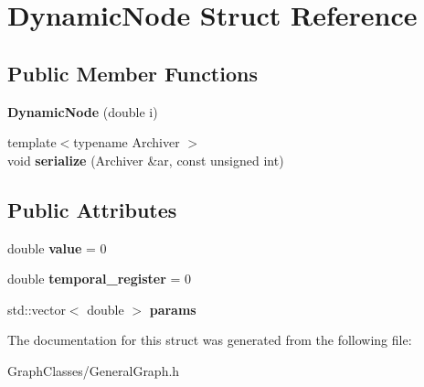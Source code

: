 \hypertarget{structDynamicNode}{}\section{Dynamic\+Node Struct Reference}
\label{structDynamicNode}
\subsection*{Public Member Functions}
\begin{DoxyCompactItemize}
\item 
\mbox{\label{structDynamicNode_a96cf410a841d736bb55b410dd8ae41ed}} 
{\bfseries Dynamic\+Node} (double i)
\item 
\mbox{\label{structDynamicNode_a213fbd6be0876b04cb6d24549bf209f5}} 
{\footnotesize template$<$typename Archiver $>$ }\\void {\bfseries serialize} (Archiver \&ar, const unsigned int)
\end{DoxyCompactItemize}
\subsection*{Public Attributes}
\begin{DoxyCompactItemize}
\item 
\mbox{\label{structDynamicNode_afe4e467d9efaf4c2fac54df7a3c561da}} 
double {\bfseries value} = 0
\item 
\mbox{\label{structDynamicNode_a48f76ef3032dd0c76e618e62a09cb634}} 
double {\bfseries temporal\+\_\+register} = 0
\item 
\mbox{\label{structDynamicNode_a81c008fff53985466c78dfae406413a6}} 
std\+::vector$<$ double $>$ {\bfseries params}
\end{DoxyCompactItemize}


The documentation for this struct was generated from the following file\+:\begin{DoxyCompactItemize}
\item 
Graph\+Classes/General\+Graph.\+h\end{DoxyCompactItemize}
